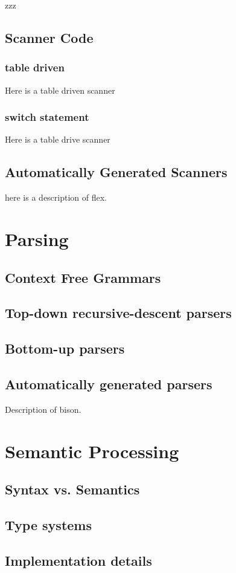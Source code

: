 \documentclass[letterpaper,12pt,openany,reqno]{book}%
\begin{document}
zzz

\chapter{Scanner Code}
\section{table driven}
Here is a table driven scanner
\section{switch statement}
Here is a table drive scanner

\chapter{Automatically Generated Scanners}
here is a description of flex.

\part{Parsing} \label{part.parser}
\chapter{Context Free Grammars}
\chapter {Top-down recursive-descent parsers}
\chapter {Bottom-up parsers}
\chapter {Automatically generated parsers}
Description of bison.

\part {Semantic Processing}
\chapter {Syntax vs. Semantics}
\chapter {Type systems}
\chapter {Implementation details}
\end{document}
